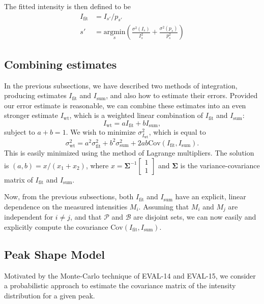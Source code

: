 \documentclass[11pt,a4paper]{article}
\def\v#1{\bm{{#1}}}
\def\cov{\mathrm{Cov}}
\def\calP{\mathcal{P}}
\def\calB{\mathcal{B}}
\def\Ifit{{I_{\mathrm{fit}}}}
\def\Isum{{I_{\mathrm{sum}}}}
\def\Iwt{{I_{\mathrm{wt}}}}
\begin{document}
The fitted intensity is then defined to be
\begin{align}
  I_{\textrm{fit}} &= I_{s'} / p_{s'} \\
  s' &= \underset{s}{\mathrm{argmin}} \left(\frac{\sigma^2(I_s)}{I_s^2} +  \frac{\sigma^2(p_s)}{p_s^2}\right)
\end{align}


\subsection{Combining estimates}

In the previous subsections, we have described two methods of integration, producing estimates $\Ifit$ and $\Isum$, and also
how to estimate their errors. Provided our error estimate is reasonable, we can combine these estimates into an even stronger
estimate $\Iwt$, which is a weighted linear combination of $\Ifit$ and $\Isum$:
\begin{equation}
  \Iwt = a\Ifit + b\Isum,
\end{equation}
subject to $a + b = 1$. We wish to minimize $\sigma^2_\Iwt$, which is equal to
\begin{equation}
  \sigma^2_{\mathrm{wt}}
  = a^2 \sigma^2_{\mathrm{fit}} + b^2 \sigma^2_{\mathrm{sum}} + 2ab \cov(\Ifit,\Isum).
\end{equation}
This is easily minimized using the method of Lagrange multipliers.
The solution is $(a,b) = x/(x_1+x_2)$,
where $x = \v\Sigma^{-1} \begin{bmatrix} 1 \\ 1 \end{bmatrix}$
and $\v\Sigma$ is the variance-covariance matrix of $\Ifit$ and $\Isum$.

Now, from the previous subsections, both $\Ifit$ and $\Isum$ have an explicit, linear dependence on the measured intensities $M_i$.
Assuming that $M_i$ and $M_j$ are independent for $i \neq j$, and that $\calP$ and $\calB$
are disjoint sets, we can now easily and explicitly compute the covariance $\cov(\Ifit, \Isum)$.


\subsection{Peak Shape Model}

Motivated by the Monte-Carlo technique of EVAL-14 and EVAL-15, we consider a probabilistic
approach to estimate the covariance matrix of the intensity distribution for a given peak.
\end{document}
